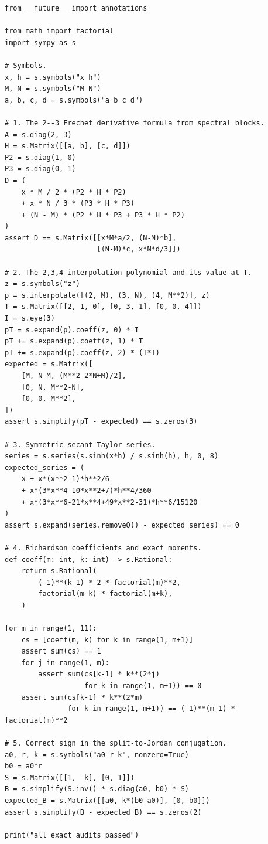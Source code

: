 \documentclass[11pt,oneside]{article}
\theoremstyle{definition}
\theoremstyle{remark}
\begin{document}
\begin{lstlisting}[style=pythonstyle,caption={Exact symbolic audit used for this report.}]
from __future__ import annotations

from math import factorial
import sympy as s

# Symbols.
x, h = s.symbols("x h")
M, N = s.symbols("M N")
a, b, c, d = s.symbols("a b c d")

# 1. The 2--3 Frechet derivative formula from spectral blocks.
A = s.diag(2, 3)
H = s.Matrix([[a, b], [c, d]])
P2 = s.diag(1, 0)
P3 = s.diag(0, 1)
D = (
    x * M / 2 * (P2 * H * P2)
    + x * N / 3 * (P3 * H * P3)
    + (N - M) * (P2 * H * P3 + P3 * H * P2)
)
assert D == s.Matrix([[x*M*a/2, (N-M)*b],
                      [(N-M)*c, x*N*d/3]])

# 2. The 2,3,4 interpolation polynomial and its value at T.
z = s.symbols("z")
p = s.interpolate([(2, M), (3, N), (4, M**2)], z)
T = s.Matrix([[2, 1, 0], [0, 3, 1], [0, 0, 4]])
I = s.eye(3)
pT = s.expand(p).coeff(z, 0) * I
pT += s.expand(p).coeff(z, 1) * T
pT += s.expand(p).coeff(z, 2) * (T*T)
expected = s.Matrix([
    [M, N-M, (M**2-2*N+M)/2],
    [0, N, M**2-N],
    [0, 0, M**2],
])
assert s.simplify(pT - expected) == s.zeros(3)

# 3. Symmetric-secant Taylor series.
series = s.series(s.sinh(x*h) / s.sinh(h), h, 0, 8)
expected_series = (
    x + x*(x**2-1)*h**2/6
    + x*(3*x**4-10*x**2+7)*h**4/360
    + x*(3*x**6-21*x**4+49*x**2-31)*h**6/15120
)
assert s.expand(series.removeO() - expected_series) == 0

# 4. Richardson coefficients and exact moments.
def coeff(m: int, k: int) -> s.Rational:
    return s.Rational(
        (-1)**(k-1) * 2 * factorial(m)**2,
        factorial(m-k) * factorial(m+k),
    )

for m in range(1, 11):
    cs = [coeff(m, k) for k in range(1, m+1)]
    assert sum(cs) == 1
    for j in range(1, m):
        assert sum(cs[k-1] * k**(2*j)
                   for k in range(1, m+1)) == 0
    assert sum(cs[k-1] * k**(2*m)
               for k in range(1, m+1)) == (-1)**(m-1) * factorial(m)**2

# 5. Correct sign in the split-to-Jordan conjugation.
a0, r, k = s.symbols("a0 r k", nonzero=True)
b0 = a0*r
S = s.Matrix([[1, -k], [0, 1]])
B = s.simplify(S.inv() * s.diag(a0, b0) * S)
expected_B = s.Matrix([[a0, k*(b0-a0)], [0, b0]])
assert s.simplify(B - expected_B) == s.zeros(2)

print("all exact audits passed")
\end{lstlisting}
\end{document}
